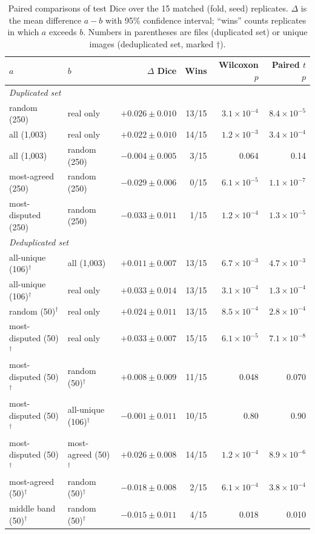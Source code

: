 \documentclass[11pt]{article}
\begin{document}
\begin{table}[t]
\centering
\caption{Paired comparisons of test Dice over the 15 matched (fold, seed) replicates. $\Delta$ is the mean difference $a-b$ with 95\% confidence interval; ``wins'' counts replicates in which $a$ exceeds $b$. Numbers in parentheses are files (duplicated set) or unique images (deduplicated set, marked $\dagger$).}
\label{tab:paired}
\footnotesize
\setlength{\tabcolsep}{4pt}
\begin{tabular}{llrrrr}
\toprule
$a$ & $b$ & $\Delta$ Dice & Wins & Wilcoxon $p$ & Paired $t$ $p$ \\
\midrule
\multicolumn{6}{l}{\emph{Duplicated set}} \\
random (250)         & real only    & $+0.026 \pm 0.010$ & 13/15 & $3.1\times10^{-4}$ & $8.4\times10^{-5}$ \\
all (1{,}003)        & real only    & $+0.022 \pm 0.010$ & 14/15 & $1.2\times10^{-3}$ & $3.4\times10^{-4}$ \\
all (1{,}003)        & random (250) & $-0.004 \pm 0.005$ & 3/15  & 0.064 & 0.14 \\
most-agreed (250)    & random (250) & $-0.029 \pm 0.006$ & 0/15  & $6.1\times10^{-5}$ & $1.1\times10^{-7}$ \\
most-disputed (250)  & random (250) & $-0.033 \pm 0.011$ & 1/15  & $1.2\times10^{-4}$ & $1.3\times10^{-5}$ \\
\midrule
\multicolumn{6}{l}{\emph{Deduplicated set}} \\
all-unique (106)$^\dagger$   & all (1{,}003)           & $+0.011 \pm 0.007$ & 13/15 & $6.7\times10^{-3}$ & $4.7\times10^{-3}$ \\
all-unique (106)$^\dagger$   & real only               & $+0.033 \pm 0.014$ & 13/15 & $3.1\times10^{-4}$ & $1.3\times10^{-4}$ \\
random (50)$^\dagger$        & real only               & $+0.024 \pm 0.011$ & 13/15 & $8.5\times10^{-4}$ & $2.8\times10^{-4}$ \\
most-disputed (50)$^\dagger$ & real only               & $+0.033 \pm 0.007$ & 15/15 & $6.1\times10^{-5}$ & $7.1\times10^{-8}$ \\
most-disputed (50)$^\dagger$ & random (50)$^\dagger$   & $+0.008 \pm 0.009$ & 11/15 & 0.048 & 0.070 \\
most-disputed (50)$^\dagger$ & all-unique (106)$^\dagger$ & $-0.001 \pm 0.011$ & 10/15 & 0.80 & 0.90 \\
most-disputed (50)$^\dagger$ & most-agreed (50)$^\dagger$ & $+0.026 \pm 0.008$ & 14/15 & $1.2\times10^{-4}$ & $8.9\times10^{-6}$ \\
most-agreed (50)$^\dagger$   & random (50)$^\dagger$   & $-0.018 \pm 0.008$ & 2/15  & $6.1\times10^{-4}$ & $3.8\times10^{-4}$ \\
middle band (50)$^\dagger$   & random (50)$^\dagger$   & $-0.015 \pm 0.011$ & 4/15  & 0.018 & 0.010 \\
\bottomrule
\end{tabular}
\end{table}
\end{document}
